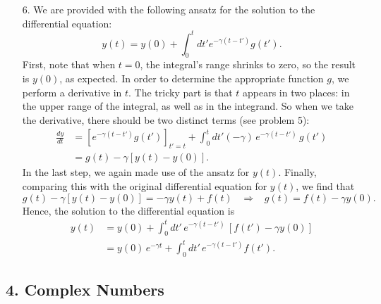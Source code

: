 \documentclass[10pt,a4paper]{article}
\begin{document}
\begin{enumerate}
\item[6.]
We are provided with the following ansatz for the solution to the
differential equation:
\begin{equation}
  y(t) = y(0) + \int_0^t dt' e^{-\gamma(t-t')} g(t').
\end{equation}
First, note that when $t = 0$, the integral's range shrinks to zero,
so the result is $y(0)$, as expected. In order to determine the
appropriate function $g$, we perform a derivative in $t$. The tricky
part is that $t$ appears in two places: in the upper range of the
integral, as well as in the integrand. So when we take the derivative,
there should be two distinct terms (see problem 5):
\begin{align}
  \frac{dy}{dt} &= \left[e^{-\gamma(t-t')} g(t')\right]_{t'=t} + \int_0^t dt'(-\gamma) \, e^{-\gamma(t-t')} \, g(t')\\
  &= g(t) - \gamma [y(t) - y(0)].
\end{align}
In the last step, we again made use of the ansatz for $y(t)$. Finally,
comparing this with the original differential equation for $y(t)$, we
find that
\begin{equation}
  g(t) - \gamma [y(t) - y(0)] = -\gamma y(t) + f(t) \;\;\; \Rightarrow \;\;\; g(t) = f(t) - \gamma y(0).
\end{equation}
Hence, the solution to the differential equation is
\begin{align}
  y(t) &= y(0) + \int_0^t dt' \, e^{-\gamma(t-t')} \,[f(t') - \gamma y(0)] \\
  &= y(0)\,e^{-\gamma t} + \int_0^t dt' \, e^{-\gamma(t-t')} f(t').
\end{align}
\end{enumerate}

\subsection*{4. Complex Numbers}
\end{document}

